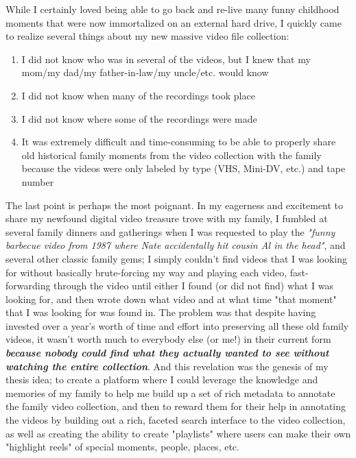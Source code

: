 While I certainly loved being able to go back and re-live many funny childhood moments that were now immortalized on an external hard drive, I quickly came to realize several things about my new massive video file collection:

\begin{enumerate}
\item I did not know who was in several of the videos, but I knew that my mom/my dad/my father-in-law/my uncle/etc. would know
\item I did not know when many of the recordings took place
\item I did not know where some of the recordings were made
\item It was extremely difficult and time-consuming to be able to properly share old historical family moments from the video collection with the family because the videos were only labeled by type (VHS, Mini-DV, etc.) and tape number
\end{enumerate}

The last point is perhaps the most poignant. In my eagerness and excitement to share my newfound digital video treasure trove with my family, I fumbled at several family dinners and gatherings when I was requested to play the \textit{"funny barbecue video from 1987 where Nate accidentally hit cousin Al in the head"}, and several other classic family gems; I simply couldn't find videos that I was looking for without basically brute-forcing my way and playing each video, fast-forwarding through the video until either I found (or did not find) what I was looking for, and then wrote down what video and at what time "that moment" that I was looking for was found in.  The problem was that despite having invested over a year's worth of time and effort into preserving all these old family videos, it wasn't worth much to everybody else (or me!) in their current form \textit{\textbf{because nobody could find what they actually wanted to see without watching the entire collection}}.  And this revelation was the genesis of my thesis idea; to create a platform where I could leverage the knowledge and memories of my family to help me build up a set of rich metadata to annotate the family video collection, and then to reward them for their help in annotating the videos by building out a rich, faceted search interface to the video collection, as well as creating the ability to create "playlists" where users can make their own "highlight reels" of special moments, people, places, etc.



